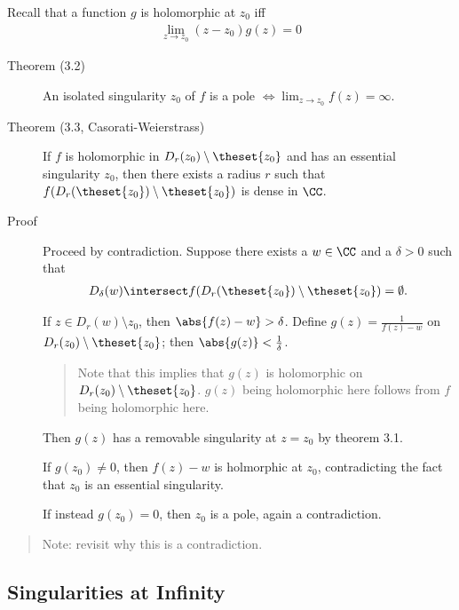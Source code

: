 Recall that a function \(g\) is holomorphic at \(z_0\) iff
\begin{align*}
\lim_{z\to z_0}  (z-z_0) g(z) = 0
\end{align*}

\begin{description}
\item[Theorem (3.2)]
An isolated singularity \(z_0\) of \(f\) is a pole
\(\iff \lim_{z\to z_0} f(z) = \infty\).
\item[Theorem (3.3, Casorati-Weierstrass)]
If \(f\) is holomorphic in \(D_r(z_0) \setminus \theset{z_0}\) and has
an essential singularity \(z_0\), then there exists a radius \(r\) such
that \(f(D_r(\theset{z_0})\setminus \theset{z_0})\) is dense in \(\CC\).
\item[Proof]
Proceed by contradiction. Suppose there exists a \(w\in \CC\) and a
\(\delta > 0\) such that
\begin{align*}
D_\delta(w) \intersect f(D_r(\theset{z_0})\setminus \theset{z_0}) = \emptyset
.\end{align*}

If \(z \in D_r(w)\setminus{z_0}\), then \(\abs{f(z) - w} > \delta\).
Define \(g(z) = \frac{1}{f(z) - w}\) on
\(D_r(z_0) \setminus\theset{z_0}\); then
\(\abs{g(z)} < \frac{1}{\delta}\).

\begin{quote}
Note that this implies that \(g(z)\) is holomorphic on
\(D_r(z_0) \setminus \theset{z_0}\). \(g(z)\) being holomorphic here
follows from \(f\) being holomorphic here.
\end{quote}

Then \(g(z)\) has a removable singularity at \(z = z_0\) by theorem 3.1.

If \(g(z_0) \neq 0\), then \(f(z) - w\) is holmorphic at \(z_0\),
contradicting the fact that \(z_0\) is an essential singularity.

If instead \(g(z_0) = 0\), then \(z_0\) is a pole, again a
contradiction.
\end{description}

\begin{quote}
Note: revisit why this is a contradiction.
\end{quote}

\hypertarget{singularities-at-infinity}{%
\subsection{Singularities at Infinity}\label{singularities-at-infinity}}

